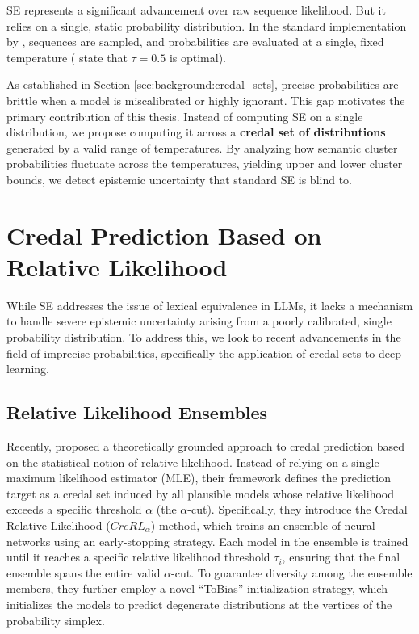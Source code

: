 SE represents a significant advancement over raw 
sequence likelihood. But it relies on a single, static probability
distribution. In the standard implementation by 
\textcite{kuhn2023semanticuncertaintylinguisticinvariances}, 
sequences are sampled, and probabilities are evaluated at a single, 
fixed temperature 
(\textcite{kuhn2023semanticuncertaintylinguisticinvariances} 
state that $\tau=0.5$ is optimal). 

As established in Section \ref{sec:background:credal_sets}, precise
probabilities are brittle when a model is miscalibrated or highly 
ignorant. This gap motivates the primary contribution of this thesis.
Instead of computing SE on a single distribution, we propose computing
it across a \textbf{credal set of distributions} generated by a valid
range of temperatures. By analyzing how semantic cluster probabilities
fluctuate across the temperatures, yielding upper and lower cluster bounds, we
detect epistemic uncertainty that standard SE is blind to.


\section{Credal Prediction Based on Relative Likelihood}
\label{sec:related_work:credal_prediction}
While SE addresses the issue of lexical equivalence in LLMs, it lacks
a mechanism to handle severe epistemic uncertainty arising from a
poorly calibrated, single probability distribution. To address this,
we look to recent advancements in the field of imprecise probabilities,
specifically the application of credal sets to deep learning.

\subsection{Relative Likelihood Ensembles}
\label{sec:related_work:credal_prediction:rel_ll_ensembles}
Recently, \textcite{löhr2025credalpredictionbasedrelative}
proposed a theoretically grounded approach to credal prediction
based on the statistical notion of relative likelihood. Instead
of relying on a single maximum likelihood estimator (MLE),
their framework defines the prediction target as a credal set induced 
by all plausible models whose relative likelihood exceeds a specific 
threshold $\alpha$ (the $\alpha$-cut). 
Specifically, they introduce the
Credal Relative Likelihood ($CreRL_\alpha$) method, which trains an 
ensemble of neural networks using an early-stopping strategy. Each 
model in the ensemble is trained until it reaches a specific relative 
likelihood threshold $\tau_i$, ensuring that the final ensemble spans
the entire valid $\alpha$-cut.
To guarantee diversity among the ensemble members, they further employ
a novel ``ToBias'' initialization strategy, which initializes the 
models to predict degenerate distributions at the vertices of the 
probability simplex. 



